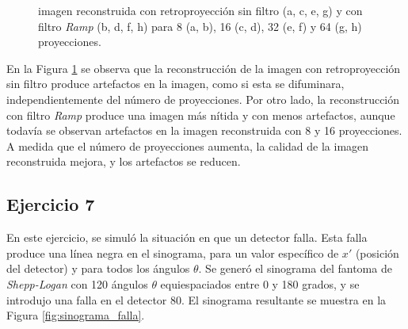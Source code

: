 \documentclass[11pt, twocolumn]{article}
\begin{document}
\begin{figure}[htbp]
    \hfill
    \hfill
    \hfill
    \caption{imagen reconstruida con retroproyección sin filtro (a, c, e, g) y con filtro \textit{Ramp} (b, d, f, h) para 8 (a, b), 16 (c, d), 32 (e, f) y 64 (g, h) proyecciones.}
    \label{fig: res_ej_6}
\end{figure}

En la Figura \ref{fig: res_ej_6} se observa que la reconstrucción de la imagen con retroproyección sin filtro produce artefactos en la imagen, como si esta se difuminara, independientemente del número de proyecciones. Por otro lado, la reconstrucción con filtro \textit{Ramp} produce una imagen más nítida y con menos artefactos, aunque todavía se observan artefactos en la imagen reconstruida con 8 y 16 proyecciones. A medida que el número de proyecciones aumenta, la calidad de la imagen reconstruida mejora, y los artefactos se reducen.

\subsection*{Ejercicio 7}
En este ejercicio, se simuló la situación en que un detector falla. Esta falla produce una línea negra en el sinograma, para un valor específico de $x'$ (posición del detector) y para todos los ángulos $\theta$. Se generó el sinograma del fantoma de \textit{Shepp-Logan} con 120 ángulos $\theta$ equiespaciados entre 0 y 180 grados, y se introdujo una falla en el detector 80. El sinograma resultante se muestra en la Figura \ref{fig:sinograma_falla}.
\end{document}
